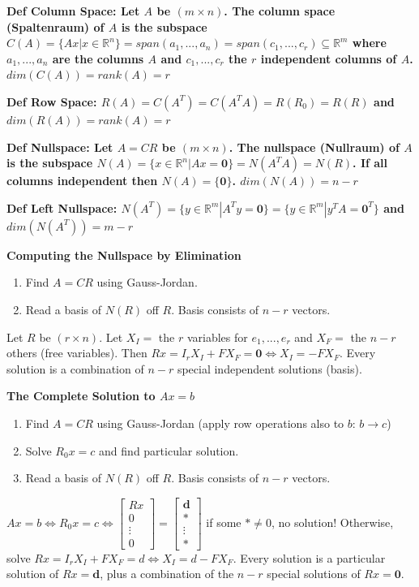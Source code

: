 \documentclass[7pt,landscape, margin = 0.1mm]{article}
\newcommand{\COL}[1]{ \color{chaptercolor} \bf{#1}\color{black}     \\}
\newcommand{\DEF}[2]{\color{chaptercolor}\bf{Def #1}:\color{black}    \hspace{0.2cm} #2}
\begin{document}
\begin{multicols}{4}
\begin{flushleft}
{{\DEF{Column Space}{Let $A$ be $(m \times n)$. The column space (Spaltenraum) of $A$ is the subspace $C(A)=\{Ax|x\in \mathbb{R}^n\} = span(a_1, ..., a_n) = span(c_1, ..., c_r) \subseteq \mathbb{R}^m$ where $a_1, ..., a_n$ are the columns $A$ and $c_1, ..., c_r$ the $r$ independent columns of $A$. $dim(C(A))=rank(A)=r$}

\DEF{Row Space}{$R(A)=C(A^T)=C(A^TA)=R(R_0)=R(R)$ and $dim(R(A))=rank(A)=r$}

\DEF{Nullspace}{Let $A=CR$ be $(m\times n)$. The nullspace (Nullraum) of $A$ is the subspace $N(A)=\{x \in \mathbb{R}^n | Ax=\bm{0}\}=N(A^TA)=N(R)$. If all columns independent then $N(A)=\{\bm{0}\}$. $dim(N(A))=n-r$}

\DEF{Left Nullspace}{$N(A^T)=\{y \in \mathbb{R}^m | A^Ty=\bm{0}\}=\{y \in \mathbb{R}^m | y^TA=\bm{0}^T\}$ and $dim(N(A^T))=m-r$}

\COL{Computing the Nullspace by Elimination}
\begin{enumerate}[nolistsep]
    \item Find $A=CR$ using Gauss-Jordan.
    \item Read a basis of $N(R)$ off $R$. Basis consists of $n-r$ vectors.
\end{enumerate}
Let $R$ be $(r \times n)$. Let $X_I =$ the $r$ variables for $e_1, ..., e_r$ and $X_F =$ the $n-r$ others (free variables). Then $Rx=I_rX_I+FX_F=\bm{0} \Leftrightarrow X_I = -FX_F$. Every solution is a combination of $n-r$ special independent solutions (basis).

\COL{The Complete Solution to $Ax=b$}
\begin{enumerate}[nolistsep]
    \item Find $A=CR$ using Gauss-Jordan (apply row operations also to $b$: $b \rightarrow c$)
    \item Solve $R_0x=c$ and find particular solution.
    \item Read a basis of $N(R)$ off $R$. Basis consists of $n-r$ vectors.
\end{enumerate}
$Ax=b \Leftrightarrow R_0x=c \Leftrightarrow \begin{bmatrix}
    Rx\\
    0\\
    \vdots\\
    0
\end{bmatrix} = \begin{bmatrix}
    \bm{d}\\
    *\\
    \vdots\\
    *
\end{bmatrix}$ if some $*\not=0$, no solution! Otherwise, solve $Rx=I_rX_I+FX_F=d \Leftrightarrow X_I=d-FX_F$. Every solution is a particular solution of $Rx=\bm{d}$, plus a combination of the $n-r$ special solutions of $Rx=\bm{0}$.

}}
\end{flushleft}
\end{multicols}
\end{document}
